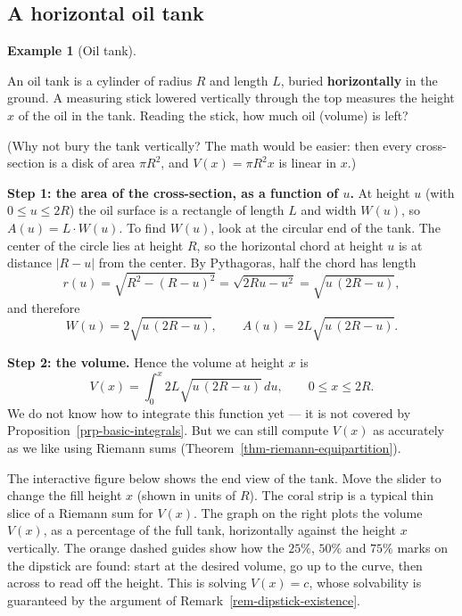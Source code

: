 \documentclass[
  letterpaper,
  DIV=11,
  numbers=noendperiod]{scrreprt}
\theoremstyle{plain}
\theoremstyle{plain}
\theoremstyle{definition}
\theoremstyle{definition}
\theoremstyle{definition}
\newtheorem{example}{Example}[chapter]
\theoremstyle{plain}
\theoremstyle{plain}
\theoremstyle{remark}
\begin{document}
\subsection{A horizontal oil tank}\label{a-horizontal-oil-tank}

\begin{example}[Oil
tank]\protect\hypertarget{exm-oil-tank}{}\label{exm-oil-tank}

An oil tank is a cylinder of radius \(R\) and length \(L\), buried
\textbf{horizontally} in the ground. A measuring stick lowered
vertically through the top measures the height \(x\) of the oil in the
tank. Reading the stick, how much oil (volume) is left?

(Why not bury the tank vertically? The math would be easier: then every
cross-section is a disk of area \(\pi R^2\), and \(V(x) = \pi R^2 x\) is
linear in \(x\).)

\textbf{Step 1: the area of the cross-section, as a function of \(u\).}
At height \(u\) (with \(0\le u\le 2R\)) the oil surface is a rectangle
of length \(L\) and width \(W(u)\), so \(A(u) = L\cdot W(u)\). To find
\(W(u)\), look at the circular end of the tank. The center of the circle
lies at height \(R\), so the horizontal chord at height \(u\) is at
distance \(\lvert R-u \rvert\) from the center. By Pythagoras, half the
chord has length \[
r(u) = \sqrt{R^2 - (R-u)^2} = \sqrt{2Ru - u^2} = \sqrt{u\,(2R-u)},
\] and therefore \[
W(u) = 2\sqrt{u\,(2R-u)}, \qquad A(u) = 2L\sqrt{u\,(2R-u)} .
\]

\textbf{Step 2: the volume.} Hence the volume at height \(x\) is \[
V(x) = \int_0^x 2L\sqrt{u\,(2R-u)}\,du, \qquad 0\le x\le 2R .
\] We do not know how to integrate this function yet --- it is not
covered by Proposition~\ref{prp-basic-integrals}. But we can still
compute \(V(x)\) as accurately as we like using Riemann sums
(Theorem~\ref{thm-riemann-equipartition}).

\end{example}

The interactive figure below shows the end view of the tank. Move the
slider to change the fill height \(x\) (shown in units of \(R\)). The
coral strip is a typical thin slice of a Riemann sum for \(V(x)\). The
graph on the right plots the volume \(V(x)\), as a percentage of the
full tank, horizontally against the height \(x\) vertically. The orange
dashed guides show how the \(25\%\), \(50\%\) and \(75\%\) marks on the
dipstick are found: start at the desired volume, go up to the curve,
then across to read off the height. This is solving \(V(x) = c\), whose
solvability is guaranteed by the argument of
Remark~\ref{rem-dipstick-existence}.
\end{document}
